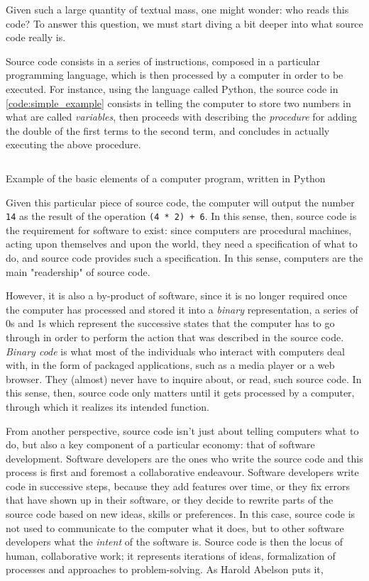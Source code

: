 Given such a large quantity of textual mass, one might wonder: who reads this code? To answer this question, we must start diving a bit deeper into what source code really is.

Source code consists in a series of instructions, composed in a particular programming language, which is then processed by a computer in order to be executed. For instance, using the language called Python, the source code in \ref{code:simple_example} consists in telling the computer to store two numbers in what are called \emph{variables}, then proceeds with describing the \emph{procedure} for adding the double of the first terms to the second term, and concludes in actually executing the above procedure.

\begin{listing}
    \inputminted{python}{./corpus/simple.py}
    \caption{Example of the basic elements of a computer program, written in Python}
    \label{code:simple_example}
\end{listing}

Given this particular piece of source code, the computer will output the number \lstinline{14} as the result of the operation \lstinline{(4 * 2) + 6}. In this sense, then, source code is the requirement for software to exist: since computers are procedural machines, acting upon themselves and upon the world, they need a specification of what to do, and source code provides such a specification. In this sense, computers are the main "readership" of source code.

However, it is  also a by-product of software, since it is no longer required once the computer has processed and stored it into a \emph{binary} representation, a series of 0s and 1s which represent the successive states that the computer has to go through in order to perform the action that was described in the source code. \emph{Binary code} is what most of the individuals who interact with computers deal with, in the form of packaged applications, such as a media player or a web browser. They (almost) never have to inquire about, or read, such source code. In this sense, then, source code only matters until it gets processed by a computer, through which it realizes its intended function.

From another perspective, source code isn't just about telling computers what to do, but also a key component of a particular economy: that of software development. Software developers are the ones who write the source code and this process is first and foremost a collaborative endeavour. Software developers write code in successive steps, because they add features over time, or they fix errors that have shown up in their software, or they decide to rewrite parts of the source code based on new ideas, skills or preferences. In this case, source code is not used to communicate to the computer what it does, but to other software developers what the \emph{intent} of the software is. Source code is then the locus of human, collaborative work; it represents iterations of ideas, formalization of processes and approaches to problem-solving. As Harold Abelson puts it,

